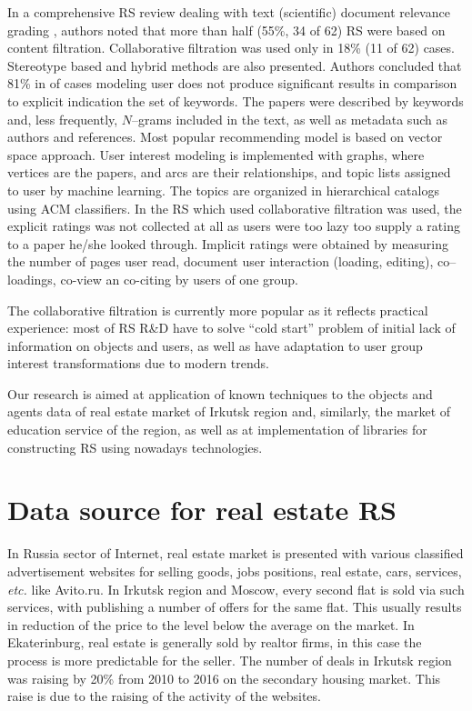 \documentclass[conference]{IEEEtran}
\begin{document}
In a comprehensive RS review dealing with text (scientific) document relevance grading \cite{br13}, authors noted that more than half (55\%, 34 of 62) RS were based on content filtration.  Collaborative filtration was used only in 18\% (11 of 62) cases.  Stereotype based and hybrid methods are also presented.  Authors concluded that 81\% in of cases modeling user does not produce significant results in comparison to explicit indication the set of keywords.  The papers were described by keywords and, less frequently, $N$--grams included in the text, as well as metadata such as authors and references.  Most popular recommending model is based on vector space approach.  User interest modeling is implemented with graphs, where vertices are the papers, and arcs are their relationships, and topic lists assigned to user by machine learning.  The topics are organized in hierarchical catalogs using ACM classifiers.  In the RS which used collaborative filtration was used, the explicit ratings was not collected at all as users were too lazy too supply a rating to a paper he/she looked through.  Implicit ratings were obtained by measuring the number of pages user read, document user interaction (loading, editing), co--loadings, co-view an co-citing by users of one group.

The collaborative filtration is currently more popular as it reflects practical experience: most of RS R\&D have to solve ``cold start'' problem of initial lack of information on objects and users, as well as have adaptation to user group interest transformations due to modern trends.


Our research is aimed at application of known techniques to the objects and agents data of real estate market of Irkutsk region and, similarly, the market of education service of the region, as well as at implementation of libraries for constructing RS using nowadays technologies.

\section{Data source for real estate RS}

In Russia sector of Internet, real estate market is presented with various classified advertisement websites for selling goods, jobs positions, real estate, cars, services, \emph{etc.} like Avito.ru.  In Irkutsk region and Moscow, every second flat is sold via such services, with publishing a number of offers for the same flat.  This usually results in reduction of the price to the level below the average on the market.   In Ekaterinburg, real estate is generally sold by realtor firms, in this case the process is more predictable for the seller.  The number of deals in Irkutsk region was raising by 20\% from 2010 to 2016 on the secondary housing market.  This raise is due to the raising of the activity of the websites.
\end{document}
